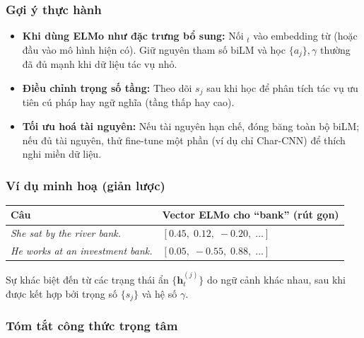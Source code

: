 \subsubsection{Gợi ý thực hành}
\label{ssec:elmo_practice}

\begin{itemize}
  \item \textbf{Khi dùng ELMo như đặc trưng bổ sung:} Nối $_t$ vào embedding từ (hoặc đầu vào mô hình hiện có). Giữ nguyên tham số biLM và học $\{a_j\},\gamma$ thường đã đủ mạnh khi dữ liệu tác vụ nhỏ.
  \item \textbf{Điều chỉnh trọng số tầng:} Theo dõi $s_j$ sau khi học để phân tích tác vụ ưu tiên cú pháp hay ngữ nghĩa (tầng thấp hay cao).
  \item \textbf{Tối ưu hoá tài nguyên:} Nếu tài nguyên hạn chế, đóng băng toàn bộ biLM; nếu đủ tài nguyên, thử fine-tune một phần (ví dụ chỉ Char-CNN) để thích nghi miền dữ liệu.
\end{itemize}

\subsubsection{Ví dụ minh hoạ (giản lược)}
\label{ssec:elmo_example}

\begin{center}
\begin{tabular}{p{} p{}}
\toprule
\textbf{Câu} & \textbf{Vector ELMo cho ``bank'' (rút gọn)} \\
\midrule
\emph{She sat by the river bank.} & $[0.45,\; 0.12,\; -0.20,\; \dots]$ \\
\emph{He works at an investment bank.} & $[0.05,\; -0.55,\; 0.88,\; \dots]$ \\
\bottomrule
\end{tabular}
\end{center}

Sự khác biệt đến từ các trạng thái ẩn $\{\mathbf{h}_t^{(j)}\}$ do ngữ cảnh khác nhau, sau khi được kết hợp bởi trọng số $\{s_j\}$ và hệ số $\gamma$.

\subsubsection{Tóm tắt công thức trọng tâm}
\label{ssec:elmo_key_equations}

